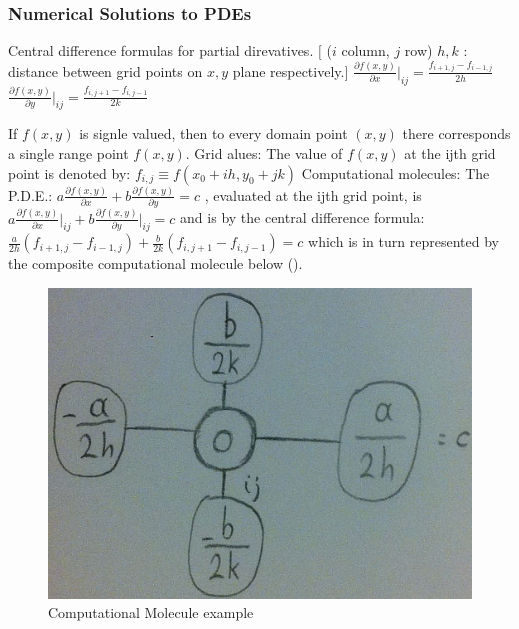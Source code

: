 \documentclass[12pt]{article}
\begin{document}
\begin{flushleft}
	\subsubsection{Numerical Solutions to PDEs} 
	
	\textbullet \quad Central difference formulas for partial direvatives. \linebreak 
	$[$ ($i$ column, $j$ row) $h,k$  :  distance between grid points on $x,y$ plane respectively.$]$ \linebreak 
	$\displaystyle \frac{\partial f(x,y)}{\partial x} \big|_{ij} = \frac{f_{i+1,j} -f_{i-1,j}}{2h} $ \linebreak 
	$\displaystyle \frac{\partial f(x,y)}{\partial y} \big|_{ij} = \frac{f_{i,j+1} -f_{i,j-1}}{2k} $ \linebreak 
	
	\textbullet \quad If $f(x,y)$ is signle valued, then to every domain point $(x,y)$ there corresponds a single range point $f(x,y)$. \linebreak 
	\textbullet \quad Grid alues: The value of $f(x,y)$ at the ijth grid point is denoted by: $f_{i,j} \equiv f(x_0 + ih, y_0 +jk)$ \linebreak 
	\textbullet \quad Computational molecules: The P.D.E.: $\displaystyle a\frac{\partial f(x,y)}{\partial x} + b \frac{\partial f(x,y)}{\partial y} = c$ , evaluated at the ijth grid point, is $\displaystyle a\frac{\partial f(x,y)}{\partial x} \big|_{ij} + b \frac{\partial f(x,y)}{\partial y} \big|_{ij} = c$ and is by the central difference formula: $\displaystyle \frac{a}{2h} (f_{i+1,j} -f_{i-1,j}) + \frac{b}{2k} ( f_{i,j+1} - f_{i,j-1} ) = c$ which is in turn represented by the composite computational molecule below (). \linebreak 
	
	\begin{figure}[H]
	\centering
	\includegraphics[scale=0.3]{computationalMolecule}
	\caption{Computational Molecule example}
	\label{fig:computationalMolecule}
	\end{figure} 
	

\end{flushleft}
\end{document}
